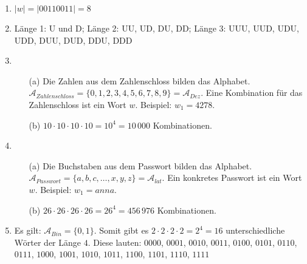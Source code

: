 \begin{enumerate}
\item $|w| = |00110011| = 8$
\item Länge 1: U und D; Länge 2: UU, UD, DU, DD; Länge 3: UUU, UUD, UDU, UDD, DUU, DUD, DDU, DDD
\item 
	\begin{enumerate}
	\item[(a)] Die Zahlen aus dem Zahlenschloss bilden das Alphabet. $\mathscr{A}_{Zahlenschloss}=\{0, 1, 2, 3, 4, 5, 6, 7, 8, 9\}=\mathscr{A}_{Dez}$. Eine Kombination für das Zahlenschloss ist ein Wort $w$. Beispiel: $w_1 = 4278$.
	\item[(b)] $10 \cdot 10 \cdot 10 \cdot 10 = 10^4 = 10\,000$ Kombinationen.
	\end{enumerate}
\item 
	\begin{enumerate}
	\item[(a)] Die Buchstaben aus dem Passwort bilden das Alphabet. $\mathscr{A}_{Passwort}=\{a, b, c, \dots , x, y, z\}=\mathscr{A}_{lat}$. Ein konkretes Passwort ist ein Wort $w$. Beispiel: $w_1 = anna$.
	\item[(b)] $26 \cdot 26 \cdot 26 \cdot 26 = 26^4 = 456\,976$ Kombinationen.
	\end{enumerate}
\item Es gilt: $\mathscr{A}_{Bin} = \{0, 1\}$. Somit gibt es $2 \cdot 2 \cdot 2 \cdot 2 = 2^4 = 16$ unterschiedliche Wörter der Länge $4$. Diese lauten: $0000$, $0001$, $0010$, $0011$, $0100$, $0101$, $0110$, $0111$, $1000$, $1001$, $1010$, $1011$, $1100$, $1101$, $1110$, $1111$
\end{enumerate}